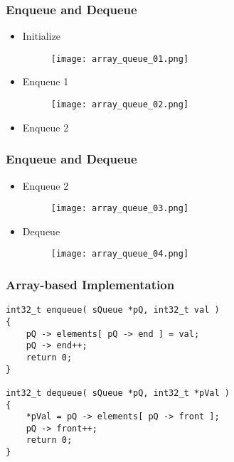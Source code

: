 \documentclass[11pt]{beamer}
\begin{document}
\begin{frame}
\frametitle{Enqueue and Dequeue}
\begin{itemize}
\item Initialize
\begin{figure}
\centering
\texttt{[image: array\_queue\_01.png]}
\end{figure}
\item Enqueue 1
\begin{figure}
\centering
\texttt{[image: array\_queue\_02.png]}
\end{figure}
\item Enqueue 2
\end{itemize}
\end{frame}

\begin{frame}
\frametitle{Enqueue and Dequeue}
\begin{itemize}
\item Enqueue 2
\begin{figure}
\centering
\texttt{[image: array\_queue\_03.png]}
\end{figure}
\item Dequeue
\begin{figure}
\centering
\texttt{[image: array\_queue\_04.png]}
\end{figure}
\end{itemize}
\end{frame}

\begin{frame}[fragile]
\frametitle{Array-based Implementation}
\begin{lstlisting}
int32_t enqueue( sQueue *pQ, int32_t val )
{
    pQ -> elements[ pQ -> end ] = val;
    pQ -> end++;
    return 0;
}

int32_t dequeue( sQueue *pQ, int32_t *pVal )
{
    *pVal = pQ -> elements[ pQ -> front ]; 
    pQ -> front++;
    return 0;
}
\end{lstlisting}
\end{frame}
\end{document}
